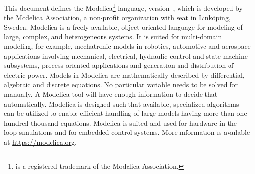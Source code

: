 \begin{center}
\large\bfseries\sffamily
\abstractname
\end{center}

This document defines the Modelica\footnote{%
 is a registered trademark of the Modelica Association.
}
language, version~\mlsversion, which is developed by the Modelica Association, a non-profit organization with seat in Linköping, Sweden.
Modelica is a freely available, object-oriented language for modeling of large, complex, and heterogeneous systems.
It is suited for multi-domain modeling, for example, mechatronic models in robotics, automotive and aerospace applications involving mechanical, electrical, hydraulic control and state machine subsystems, process oriented applications and generation and distribution of electric power.
Models in Modelica are mathematically described by differential, algebraic and discrete equations.
No particular variable needs to be solved for manually.
A Modelica tool will have enough information to decide that automatically.
Modelica is designed such that available, specialized algorithms can be utilized to enable efficient handling of large models having more than one hundred thousand equations.
Modelica is suited and used for hardware-in-the-loop simulations and for embedded control systems.
More information is available at \url{https://modelica.org}.
